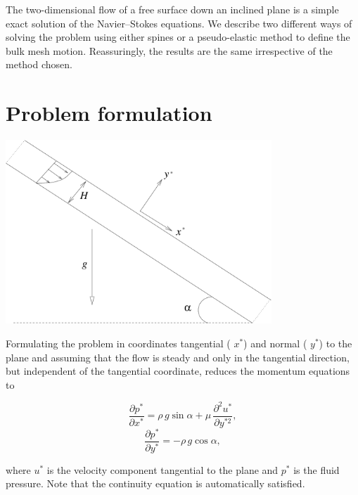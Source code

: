 The two-\/dimensional flow of a free surface down an inclined plane is a simple exact solution of the Navier--Stokes equations. We describe two different ways of solving the problem using either spines or a pseudo-\/elastic method to define the bulk mesh motion. Reassuringly, the results are the same irrespective of the method chosen.



 

\hypertarget{index_form}{}\section{Problem formulation}\label{index_form}
 
\begin{DoxyImage}
\includegraphics[width=0.75\textwidth]{sketch}
\end{DoxyImage}


Formulating the problem in coordinates tangential ( $x^{*}$) and normal ( $y^{*}$) to the plane and assuming that the flow is steady and only in the tangential direction, but independent of the tangential coordinate, reduces the momentum equations to

\begin{center} \[ \frac{\partial p^*}{\partial x^*} = \rho \,g \sin\alpha + \mu\,\frac{\partial^{2} u^*}{\partial y^{*2}}, \] \[ \frac{\partial p^*}{\partial y^*} = -\rho \,g \cos\alpha, \] \end{center}  where $u^*$ is the velocity component tangential to the plane and $p^*$ is the fluid pressure. Note that the continuity equation is automatically satisfied.

